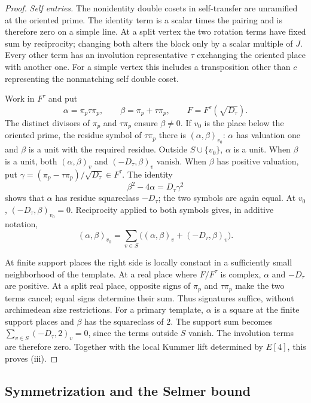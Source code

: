 \begin{proof}
\emph{Self entries.}
The nonidentity double cosets in self-transfer are unramified at the
oriented prime. The identity term is a scalar times the pairing and
is therefore zero on a simple line. At a split vertex the two rotation
terms have fixed sum by reciprocity; changing both alters the block
only by a scalar multiple of $J$. Every other term has an involution
representative $\tau$ exchanging the oriented place with another one.
For a simple vertex this includes a transposition other than $c$
representing the nonmatching self double coset.

Work in $F^\tau$ and put
\[
 \alpha=\pi_p\tau\pi_p,\qquad
 \beta=\pi_p+\tau\pi_p,\qquad
 F=F^\tau(\sqrt{D_\tau}).
\]
The distinct divisors of $\pi_p$ and $\tau\pi_p$ ensure $\beta\ne0$.
If $v_0$ is the place below the oriented prime, the residue symbol of
$\tau\pi_p$ there is $(\alpha,\beta)_{v_0}$: $\alpha$ has valuation
one and $\beta$ is a unit with the required residue. Outside
$S\cup\{v_0\}$, $\alpha$ is a unit. When $\beta$ is a unit, both
$(\alpha,\beta)_v$ and $(-D_\tau,\beta)_v$ vanish. When $\beta$ has
positive valuation, put
$\gamma=(\pi_p-\tau\pi_p)/\sqrt{D_\tau}\in F^\tau$. The identity
\[
 \beta^2-4\alpha=D_\tau\gamma^2
\]
shows that $\alpha$ has residue squareclass $-D_\tau$; the two
symbols are again equal. At $v_0$, $(-D_\tau,\beta)_{v_0}=0$.
Reciprocity applied to both symbols gives, in additive notation,
\begin{equation}\label{eq:lm:self-spin}
 (\alpha,\beta)_{v_0}
 =\sum_{v\in S}\bigl((\alpha,\beta)_v+(-D_\tau,\beta)_v\bigr).
\end{equation}

At finite support places the right side is locally constant in a
sufficiently small neighborhood of the template. At a real place
where $F/F^\tau$ is complex, $\alpha$ and $-D_\tau$ are positive.
At a split real place, opposite signs of $\pi_p$ and $\tau\pi_p$
make the two terms cancel; equal signs determine their sum. Thus
signatures suffice, without archimedean size restrictions.
For a primary template, $\alpha$ is a square at the finite support
places and $\beta$ has the squareclass of $2$. The support sum becomes
$\sum_{v\in S}(-D_\tau,2)_v=0$, since the terms outside $S$ vanish.
The involution terms are therefore zero. Together with the local
Kummer lift determined by $E[4]$, this proves \textup{(iii)}.
\end{proof}

\subsection{Symmetrization and the Selmer bound}

